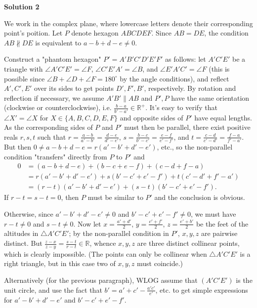 \begin{enumerate}
 



\textbf{Solution 2}

We work in the complex plane, where lowercase letters denote their corresponding point's poition. Let $P$ denote hexagon $ABCDEF$. Since $AB=DE$, the condition $AB\not\parallel DE$ is equivalent to $a-b+d-e\ne 0$.

 Construct a "phantom hexagon" $P'=A'B'C'D'E'F'$ as follows: let $A'C'E'$ be a triangle with $\angle{A'C'E'}=\angle{F}$, $\angle{C'E'A'}=\angle{B}$, and $\angle{E'A'C'}=\angle{F}$ (this is possible since $\angle{B}+\angle{D}+\angle{F}=180^\circ$ by the angle conditions), and reflect $A',C',E'$ over its sides to get points $D',F',B'$, respectively. By rotation and reflection if necessary, we assume $A'B'\parallel AB$ and $P',P$ have the same orientation (clockwise or counterclockwise), i.e. $\frac{b-a}{b'-a'}\in\mathbb{R}^+$. It's easy to verify that $\angle{X'}=\angle{X}$ for $X\in\{A,B,C,D,E,F\}$ and opposite sides of $P'$ have equal lengths. As the corresponding sides of $P$ and $P'$ must then be parallel, there exist positive reals $r,s,t$ such that $r=\frac{a-b}{a'-b'}=\frac{d-e}{d'-e'}$, $s=\frac{b-c}{b'-c'}=\frac{e-f}{e'-f'}$, and $t=\frac{c-d}{c'-d'}=\frac{f-a}{f'-a'}$. But then $0\ne a-b+d-e=r(a'-b'+d'-e')$, etc., so the non-parallel condition "transfers" directly from $P$ to $P'$ and
 \begin{align*} 0 &=(a-b+d-e)+(b-c+e-f)+(c-d+f-a) \\ &=r(a'-b'+d'-e')+s(b'-c'+e'-f')+t(c'-d'+f'-a') \\ &=(r-t)(a'-b'+d'-e')+(s-t)(b'-c'+e'-f'). \end{align*}
If $r-t=s-t=0$, then $P$ must be similar to $P'$ and the conclusion is obvious.

 Otherwise, since $a'-b'+d'-e'\ne0$ and $b'-c'+e'-f'\ne0$, we must have $r-t\ne0$ and $s-t\ne0$. Now let $x=\frac{a'+d'}{2}$, $y=\frac{c'+f'}{2}$, $z=\frac{e'+b'}{2}$ be the feet of the altitudes in $\triangle{A'C'E'}$; by the non-parallel condition in $P'$, $x,y,z$ are pairwise distinct. But $\frac{z-x}{z-y}=\frac{s-t}{r-t}\in\mathbb{R}$, whence $x,y,z$ are three distinct collinear points, which is clearly impossible. (The points can only be collinear when $\triangle{A'C'E'}$ is a right triangle, but in this case two of $x,y,z$ must coincide.)

 Alternatively (for the previous paragraph), WLOG assume that $(A'C'E')$ is the unit circle, and use the fact that $b'=a'+c'-\frac{a'c'}{e'}$, etc. to get simple expressions for $a'-b'+d'-e'$ and $b'-c'+e'-f'$.


\end{enumerate}
